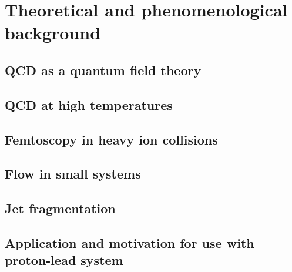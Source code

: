 \chapter{Theoretical and phenomenological background}
\label{ch:background}

\section{QCD as a quantum field theory}
\section{QCD at high temperatures}
\section{Femtoscopy in heavy ion collisions}
\section{Flow in small systems}
\section{Jet fragmentation}
\section{Application and motivation for use with proton-lead system}

